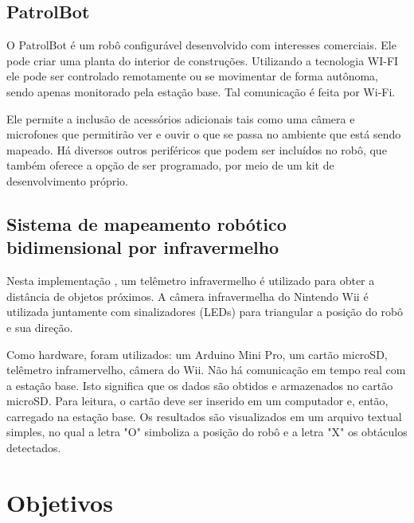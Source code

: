 \subsection{PatrolBot}
O PatrolBot \cite{patrol_bot} é um robô configurável desenvolvido com interesses comerciais. Ele pode criar uma planta do interior de construções. Utilizando a tecnologia WI-FI ele pode ser controlado remotamente ou se movimentar de forma autônoma, sendo apenas monitorado pela estação base. Tal comunicação é feita por Wi-Fi.

Ele permite a inclusão de acessórios adicionais tais como uma câmera e microfones que permitirão ver e ouvir o que se passa no ambiente que está sendo mapeado. Há diversos outros periféricos que podem ser incluídos no robô, que também oferece a opção de ser programado, por meio de um kit de desenvolvimento próprio.

\subsection{Sistema de mapeamento robótico bidimensional por infravermelho}

Nesta implementação \cite{wii}, um telêmetro infravermelho é utilizado para obter a distância de objetos próximos. A câmera infravermelha do Nintendo Wii é utilizada juntamente com sinalizadores (LEDs) para triangular a posição do robô e sua direção.

Como hardware, foram utilizados: um Arduino Mini Pro, um cartão microSD, telêmetro inframervelho, câmera do Wii. Não há comunicação em tempo real com a estação base. Isto significa que os dados são obtidos e armazenados no cartão microSD. Para leitura, o cartão deve ser inserido em um computador e, então, carregado na estação base. Os resultados são visualizados em um arquivo textual simples, no qual a letra "O" simboliza a posição do robô e a letra "X" os obtáculos detectados.

\section{Objetivos}

